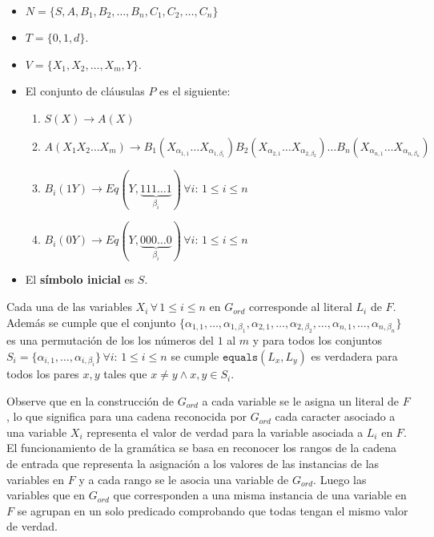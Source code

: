\begin{itemize}
    \item $N=\{S,A,B_1,B_2,\ldots,B_n,C_1,C_2,\ldots,C_n\}$
    \item $T=\{0,1,d\}$.
    \item $V=\{X_1,X_2,\ldots,X_m,Y\}$.
    \item El conjunto de cláusulas $P$ es el siguiente:
          \begin{enumerate}
              \item  $S(X)\to A(X)$
              \item $A(X_1X_2\ldots X_m)\to
                        B_1(X_{\alpha_{1,1}}\ldots X_{\alpha_{1,\beta_1}})
                        B_2(X_{\alpha_{2,1}}\ldots X_{\alpha_{2,\beta_2}})
                        \ldots B_n(X_{\alpha_{n,1}}\ldots X_{\alpha_{n,\beta_n}})$
              \item $B_i(1Y)\to  Eq(Y,\underbrace{111\ldots 1}_{\beta_i})\,\forall i: \,1\leq i\leq n$

              \item $B_i(0Y)\to  Eq(Y,\underbrace{000\ldots 0}_{\beta_i})\,\forall i:\,1\leq i\leq n$
          \end{enumerate}
    \item El \textbf{símbolo inicial} es $S$.
\end{itemize}

Cada una de las variables $X_i\,\forall\,1\leq i\leq n$ en $G_{ord}$ corresponde al literal $L_i$ de $F$.
Además se cumple que el conjunto $\{\alpha_{1,1},\ldots,\alpha_{1,\beta_1},\alpha_{2,1},\ldots,
    \alpha_{2,\beta_2},\ldots,\alpha_{n,1},\ldots,\alpha_{n,\beta_n}\}$ es una permutación de los los números del
$1$ al $m$ y para todos los conjuntos $S_i=\{\alpha_{i,1},\ldots,\alpha_{i,\beta_i}\}\,\forall i:\,1\leq i\leq n$ se cumple
$\texttt{equals}(L_x,L_y)$ es verdadera para todos los pares $x, y$ tales que $x\neq y \wedge x,y\in S_i$.

Observe que en la construcción de $G_{ord}$ a cada variable se le asigna un literal de $F$, lo que significa
para una cadena reconocida por $G_{ord}$ cada caracter asociado a una variable $X_i$ representa el valor de verdad
para la variable asociada a $L_i$ en $F$. El funcionamiento de la gramática se basa en reconocer los rangos de la cadena
de entrada que representa la asignación a los valores de las instancias de las variables en $F$ y a cada rango se le asocia
una variable de $G_{ord}$. Luego las variables que en $G_{ord}$ que corresponden a una misma instancia de una variable en
$F$ se agrupan en un solo predicado comprobando que todas tengan el mismo valor de verdad.

